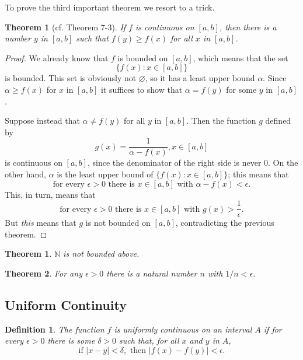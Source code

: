 \documentclass{article}
\numberwithin{definition}{subsection}
\newtheorem*{definition*}{Definition}
\numberwithin{lemma}{subsection}
\newtheorem{theorem}{Theorem}
\numberwithin{theorem}{subsection}
\newtheorem*{theorem*}{Theorem}
\begin{document}
To prove the third important theorem we resort to a trick.

\begin{theorem*}[cf. Theorem 7-3]
  If $f$ is continuous on $[a, b]$, then there is a number $y$ in $[a, b]$ such
  that $f(y) \geq f(x)$ for all $x$ in $[a, b]$.
\end{theorem*}
\begin{proof}
  We already know that $f$ is bounded on $[a, b]$, which means that the set \[
    \{f(x): x \in [a, b]\}
  \] is bounded. This set is obviously not $\varnothing$, so it has a least
  upper bound $\alpha$. Since $\alpha \geq f(x)$ for $x$ in $[a, b]$ it
  suffices to show that $\alpha = f(y)$ for some $y$ in $[a, b]$.

  Suppose instead that $\alpha \neq f(y)$ for all $y$ in $[a, b]$. Then the
  function $g$ defined by \[
    g(x) = \frac{1}{\alpha - f(x)}, x \in [a, b]
  \] is continuous on $[a, b]$, since the denominator of the right side is
  never 0. On the other hand, $\alpha$ is the least upper bound of $\{f(x): x
  \in [a, b]\}$; this means that \[
    \text{for every } \epsilon > 0 \text{ there is } x \in [a, b] \text{ with }
    \alpha - f(x) < \epsilon.
  \] This, in turn, means that \[
    \text{for every } \epsilon > 0 \text{ there is } x \in [a, b] \text{ with }
    g(x) > \frac{1}{\epsilon}.
  \] But \emph{this} means that $g$ is not bounded on $[a, b]$, contradicting
  the previous theorem.
\end{proof}

\begin{theorem}
  $\mathbb{N}$ is not bounded above.
\end{theorem}

\begin{theorem}
  For any $\epsilon > 0$ there is a natural number $n$ with $1/n < \epsilon$.
\end{theorem}

\subsection{Uniform Continuity}

\begin{definition*}
  The function $f$ is \emph{uniformly continuous on an interval $A$} if for
  every $\epsilon > 0$ there is some $\delta > 0$ such that, for all $x$ and
  $y$ in $A$, \[
    \text{if } |x - y| < \delta, \text{ then } |f(x) - f(y)| < \epsilon.
  \]
\end{definition*}
\end{document}
